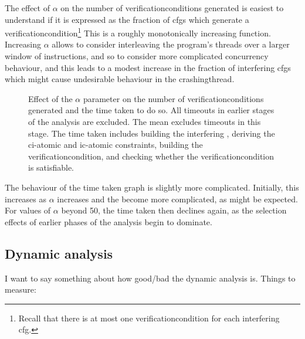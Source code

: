 The effect of $\alpha$ on the number of \glspl{verificationcondition}
generated is easiest to understand if it is expressed as the fraction
of \glspl{cfg} which generate a
\gls{verificationcondition}\footnote{Recall that there is at most one
  \gls{verificationcondition} for each interfering \gls{cfg}.}  This
is a roughly monotonically increasing function.  Increasing $\alpha$
allows {\technique} to consider interleaving the program's threads
over a larger window of instructions, and so to consider more
complicated concurrency behaviour, and this leads to a modest increase
in the fraction of interfering \glspl{cfg} which might cause
undesirable behaviour in the \gls{crashingthread}.

\begin{figure}
  
  \caption{Effect of the $\alpha$ parameter on the number of
    \glspl{verificationcondition} generated and the time taken to do
    so.  All timeouts in earlier stages of the analysis are excluded.
    The mean excludes timeouts in this stage.  The time taken includes
    building the interfering {\StateMachine}, deriving the
    \gls{ci-atomic} and \gls{ic-atomic} constraints, building the
    \gls{verificationcondition}, and checking whether the
    \gls{verificationcondition} is satisfiable.}
  \label{fig:perf:alpha:gvc:unopt}
\end{figure}

The behaviour of the time taken graph is slightly more complicated.
Initially, this increases as $\alpha$ increases and the
{\StateMachines} become more complicated, as might be expected.  For
values of $\alpha$ beyond 50, the time taken then declines again, as
the selection effects of earlier phases of the analysis begin to
dominate.  


\subsection{Dynamic analysis}

I want to say something about how good/bad the dynamic analysis is.
Things to measure:

